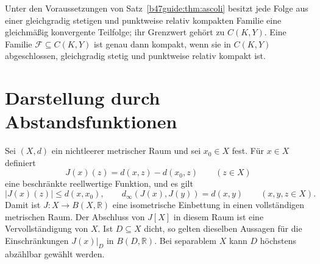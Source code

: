 \begin{theorem}
\label{b47guide:thm:ascoli-sequences}
Unter den Voraussetzungen von Satz~\ref{b47guide:thm:ascoli} besitzt
jede Folge aus einer gleichgradig stetigen und punktweise relativ
kompakten Familie eine gleichmäßig konvergente Teilfolge; ihr
Grenzwert gehört zu $C(K,Y)$.
Eine Familie $\mathcal F\subseteq C(K,Y)$ ist genau dann kompakt,
wenn sie in $C(K,Y)$ abgeschlossen, gleichgradig stetig und
punktweise relativ kompakt ist.
\end{theorem}
\section{Darstellung durch Abstandsfunktionen}

\begin{theorem}
\label{b47guide:thm:kuratowski-frechet}
Sei $(X,d)$ ein nichtleerer metrischer Raum und sei $x_0\in X$ fest.
Für $x\in X$ definiert
\[
 J(x)(z)=d(x,z)-d(x_0,z)\qquad(z\in X)
\]
eine beschränkte reellwertige Funktion, und es gilt
\[
 |J(x)(z)|\leq d(x,x_0),\qquad
 d_\infty(J(x),J(y))=d(x,y)\qquad(x,y,z\in X).
\]
Damit ist $J:X\to B(X,\mathbb R)$ eine isometrische Einbettung in einen
vollständigen metrischen Raum. Der Abschluss von $J[X]$ in diesem Raum
ist eine Vervollständigung von $X$.
Ist $D\subseteq X$ dicht, so gelten dieselben Aussagen für die
Einschränkungen $J(x)|_D$ in $B(D,\mathbb R)$. Bei separablem $X$ kann
$D$ höchstens abzählbar gewählt werden. \cite{kuratowski-notes}
\end{theorem}